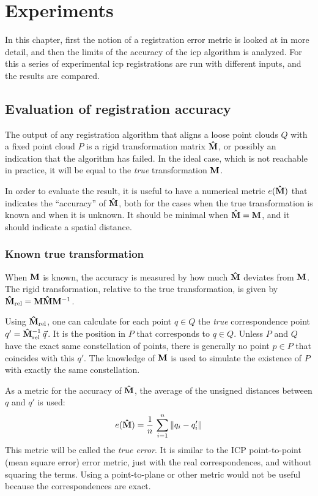 \chapter{Experiments} \label{ch:experiments}
In this chapter, first the notion of a registration error metric is looked at in more detail, and then the limits of the accuracy of the \gls{icp} algorithm is analyzed. For this a series of experimental \gls{icp} registrations are run with different inputs, and the results are compared.

\section{Evaluation of registration accuracy}
The output of any registration algorithm that aligns a loose point clouds $Q$ with a fixed point cloud $P$ is a rigid transformation matrix $\mathbf{\hat{M}}$, or possibly an indication that the algorithm has failed. In the ideal case, which is not reachable in practice, it will be equal to the \emph{true} transformation $\mathbf{M}$.

In order to evaluate the result, it is useful to have a numerical metric $e(\mathbf{\hat{M}})$ that indicates the ``accuracy'' of  $\mathbf{\hat{M}}$, both for the cases when the true transformation is known and when it is unknown. It should be minimal when $\mathbf{\hat{M}} = \mathbf{M}$, and it should indicate a spatial distance.

\subsection{Known true transformation} \label{sec:lm_known_ttrans}
When $\mathbf{M}$ is known, the accuracy is measured by how much $\mathbf{\hat{M}}$ deviates from $\mathbf{M}$. The rigid transformation, relative to the true transformation, is given by $\mathbf{\hat{M}}_{\text{rel}} = \mathbf{M} \mathbf{\hat{M}} \mathbf{M}^{-1}$.

Using $\mathbf{\hat{M}}_{\text{rel}}$, one can calculate for each point $q \in Q$ the \emph{true} correspondence point $q' = \mathbf{\hat{M}}_{\text{rel}}^{-1} \, \vec{q}$. It is the position in $P$ that corresponds to $q \in Q$. Unless $P$ and $Q$ have the exact same constellation of points, there is generally no point $p \in P$ that coincides with this $q'$. The knowledge of $\mathbf{M}$ is used to simulate the existence of $P$ with exactly the same constellation.

As a metric for the accuracy of $\mathbf{\hat{M}}$, the average of the unsigned distances between $q$ and $q'$ is used:
\begin{equation}
e(\mathbf{\hat{M}}) = \frac{1}{n} \, \sum_{i=1}^{n} \| q_i - q'_i \|
\end{equation}
This metric will be called the \emph{true error}. It is similar to the ICP point-to-point (mean square error) error metric, just with the real correspondences, and without squaring the terms. Using a point-to-plane or other metric would not be useful because the correspondences are exact.

